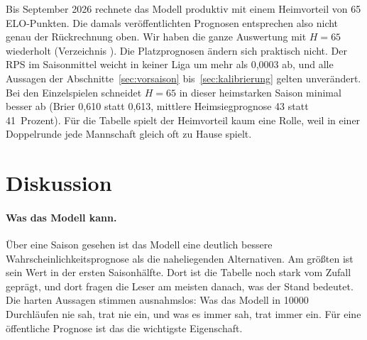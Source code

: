 \documentclass[11pt,a4paper,parskip=half,numbers=noenddot]{scrartcl}
\begin{document}
Bis September 2026 rechnete das Modell produktiv mit einem Heimvorteil von
65 ELO-Punkten. Die damals veröffentlichten Prognosen entsprechen also nicht
genau der Rückrechnung oben. Wir haben die ganze Auswertung mit $H = 65$
wiederholt (Verzeichnis ). Die Platzprognosen ändern sich
praktisch nicht. Der RPS im Saisonmittel weicht in keiner Liga um mehr als
0,0003 ab, und alle Aussagen der Abschnitte~\ref{sec:vorsaison}
bis~\ref{sec:kalibrierung} gelten unverändert. Bei den Einzelspielen
schneidet $H = 65$ in dieser heimstarken Saison minimal besser ab (Brier
0,610 statt 0,613, mittlere Heimsiegprognose 43 statt 41~Prozent). Für die
Tabelle spielt der Heimvorteil kaum eine Rolle, weil in einer Doppelrunde
jede Mannschaft gleich oft zu Hause spielt.

\section{Diskussion}\label{sec:diskussion}

\paragraph{Was das Modell kann.} Über eine Saison gesehen ist das Modell eine
deutlich bessere Wahrscheinlichkeitsprognose als die naheliegenden
Alternativen. Am größten ist sein Wert in der ersten Saisonhälfte. Dort ist
die Tabelle noch stark vom Zufall geprägt, und dort fragen die Leser am
meisten danach, was der Stand bedeutet. Die harten Aussagen stimmen
ausnahmslos: Was das Modell in \num{10000} Durchläufen nie sah, trat nie ein,
und was es immer sah, trat immer ein. Für eine öffentliche Prognose ist das
die wichtigste Eigenschaft.
\end{document}
